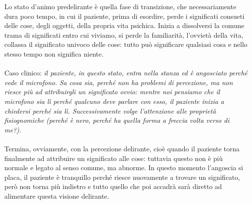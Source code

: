 Lo stato d'animo predelirante è quella fase di transizione, che
necessariamente dura poco tempo, in cui il paziente, prima di esordire,
perde i significati consueti delle cose, degli oggetti, della propria
vita psichica. Inizia a dissolversi la comune trama di significati entro
cui viviamo, si perde la familiarità, l'ovvietà della vita, collassa il
significato univoco delle cose: tutto può significare qualsiasi cosa e
nello stesso tempo non significa niente.
\\\\
Caso clinico: \emph{il paziente, in questo stato, entra nella stanza ed
è angosciato perché vede il microfono. Sa cosa sia, perché non ha
problemi di percezione, ma non riesce più ad attribuirgli un significato
ovvio: mentre noi pensiamo che il microfono sia lì perché qualcuno deve
parlare con esso, il paziente inizia a chiedersi perché sia lì.
Successivamente volge l'attenzione alle proprietà fisiognomiche (perché
è nero, perché ha quella forma a freccia volta verso di me?). }
\\\\
Termina, ovviamente, con la percezione delirante, cioè quando il
paziente torna finalmente ad attribuire un significato alle cose:
tuttavia questo non è più normale e legato al senso comune, ma abnorme.
In questo momento l'angoscia si placa, il paziente è tranquillo perché
riesce nuovamente a trovare un significato, però non torna più indietro
e tutto quello che poi accadrà sarà diretto ad alimentare questa visione
delirante.


